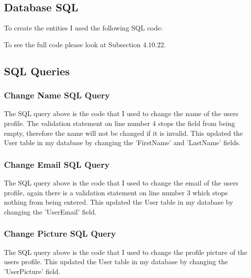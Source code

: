 \begin{landscape}
\subsection{Database SQL}

To create the entities I used the following SQL code:


To see the full code please look at Subsection 4.10.22.

\subsection{SQL Queries}

\subsubsection{Change Name SQL Query}


The SQL query above is the code that I used to change the name of the users profile. The validation statement on line number 4 stops the field from being empty, therefore the name will not be changed if it is invalid. This updated the User table in my database by changing the 'FirstName' and 'LastName' fields.

\subsubsection{Change Email SQL Query}

The SQL query above is the code that I used to change the email of the users profile, again there is a validation statement on line number 3 which stops nothing from being entered. This updated the User table in my database by changing the 'UserEmail' field.

\subsubsection{Change Picture SQL Query}

The SQL query above is the code that I used to change the profile picture of the users profile. This updated the User table in my database by changing the 'UserPicture' field.


\end{landscape}
